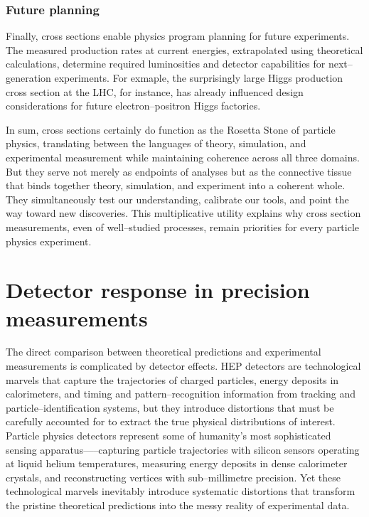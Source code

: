 \begin{definition}
            \subsubsection{Future planning}
                Finally, cross sections enable physics program planning for future experiments.
                The measured production rates at current energies, extrapolated using theoretical calculations, determine required luminosities and detector capabilities for next--generation experiments.
                For exmaple, the surprisingly large Higgs production cross section at the LHC, for instance, has already influenced design considerations for future electron--positron Higgs factories.
                
    In sum, cross sections certainly do function as the Rosetta Stone of particle physics, translating between the languages of theory, simulation, and experimental measurement while maintaining coherence across all three domains.
    But they serve not merely as endpoints of analyses but as the connective tissue that binds together theory, simulation, and experiment into a coherent whole.
    They simultaneously test our understanding, calibrate our tools, and point the way toward new discoveries.
    This multiplicative utility explains why cross section measurements, even of well--studied processes, remain priorities for every particle physics experiment.

\section{Detector response in precision measurements}
    The direct comparison between theoretical predictions and experimental measurements is complicated by detector effects.
    HEP detectors are technological marvels that capture the trajectories of charged particles, energy deposits in calorimeters, and timing and pattern--recognition information from tracking and particle--identification systems, but they introduce distortions that must be carefully accounted for to extract the true physical distributions of interest.
    Particle physics detectors represent some of humanity's most sophisticated sensing apparatus—--capturing particle trajectories with silicon sensors operating at liquid helium temperatures, measuring energy deposits in dense calorimeter crystals, and reconstructing vertices with sub--millimetre precision.
    Yet these technological marvels inevitably introduce systematic distortions that transform the pristine theoretical predictions into the messy reality of experimental data.
    

\end{definition}
